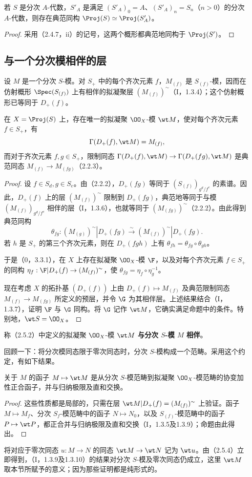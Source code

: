 若 $S$ 是分次 $A$-代数，$S'_A$ 是满足
$(S'_A)_0=A$、$(S'_A)_n=S_n$（$n>0$）的分次 $A$-代数，则存在典范同构
$\Proj(S)\simeq\Proj(S'_A)$。
\begin{proof}
采用（2.4.7，ii）的记号，这两个概形都典范地同构于 $\Proj(S')$。
\end{proof}

\subsection{与一个分次模相伴的层}
设 $M$ 是一个分次 $S$-模。对 $S_+$ 中的每个齐次元素 $f$，$M_{(f)}$ 是 $S_{(f)}$-模，因而在仿射概形 $\Spec(S_{(f)})$ 上有相伴的拟凝聚层 $(M_{(f)})^\sim$（I，1.3.4）；这个仿射概形已等同于 $D_+(f)$。

在 $X=\Proj(S)$ 上，存在唯一的拟凝聚 $\OO_X$-模 $\wt M$，使对每个齐次元素 $f\in S_+$，有
\[
\Gamma(D_+(f),\wt M)=M_{(f)},
\]
而对于齐次元素 $f,g\in S_+$，限制同态
$\Gamma(D_+(f),\wt M)\to\Gamma(D_+(fg),\wt M)$ 是典范同态
$M_{(f)}\to M_{(fg)}$（2.2.3）。
\begin{proof}
设 $f\in S_d,g\in S_e$。由（2.2.2），$D_+(fg)$ 等同于
$(S_{(f)})_{g^d/f^e}$ 的素谱。因此，$D_+(f)$ 上的层 $(M_{(f)})^\sim$ 限制到 $D_+(fg)$，典范地等同于与模
$(M_{(f)})_{g^d/f^e}$ 相伴的层（I，1.3.6），也就等同于 $(M_{(fg)})^\sim$（2.2.2）。由此得到典范同构
\[
\theta_{fg}:(M_{(g)})^\sim|D_+(fg)\xrightarrow{\sim}
(M_{(f)})^\sim|D_+(fg).
\]
若 $h$ 是 $S_+$ 的第三个齐次元素，则在 $D_+(fgh)$ 上有
$\theta_{fh}=\theta_{fg}\circ\theta_{gh}$。

于是（0，3.3.1），在 $X$ 上存在拟凝聚 $\OO_X$-模 $\F$，以及对每个齐次元素 $f\in S_+$ 的同构
$\eta_f:\F|D_+(f)\to(M_{(f)})^\sim$，使 $\theta_{fg}=\eta_f\circ\eta_g^{-1}$。

现在考虑 $X$ 的拓扑基 $(D_+(f))$ 上由
$D_+(f)\mapsto M_{(f)}$ 及典范限制同态 $M_{(f)}\to M_{(fg)}$ 所定义的预层，并令 $\G$ 为其相伴层。上述结果结合（I，1.3.7），证明 $\F$ 与 $\G$ 同构。将 $\G$ 记作 $\wt M$，它确实满足命题中的条件。特别地，$\wt S=\OO_X$。
\end{proof}

称（2.5.2）中定义的拟凝聚 $\OO_X$-模 $\wt M$ \textbf{与分次 $S$-模 $M$ 相伴}。

回顾一下：将分次模同态限于零次同态时，分次 $S$-模构成一个范畴。采用这个约定，有如下结果。

关于 $M$ 的函子 $M\mapsto\wt M$ 是从分次 $S$-模范畴到拟凝聚 $\OO_X$-模范畴的协变加性正合函子，并与归纳极限及直和交换。
\begin{proof}
这些性质都是局部的，只需在层
$\wt M|D_+(f)=(M_{(f)})^\sim$ 上验证。函子 $M\mapsto M_f$、分次 $S_f$-模范畴中的函子 $N\mapsto N_0$，以及 $S_{(f)}$-模范畴中的函子 $P\mapsto\wt P$，都正合并与归纳极限及直和交换（I，1.3.5及1.3.9）；命题由此得出。
\end{proof}
将对应于零次同态 $u:M\to N$ 的同态 $\wt M\to\wt N$ 记为 $\wt u$。由（2.5.4）立即得到，（I，1.3.9及1.3.10）的结果对分次 $S$-模及零次同态仍成立，这里 $\wt M$ 取本节所赋予的意义；因为那些证明都是纯形式的。

